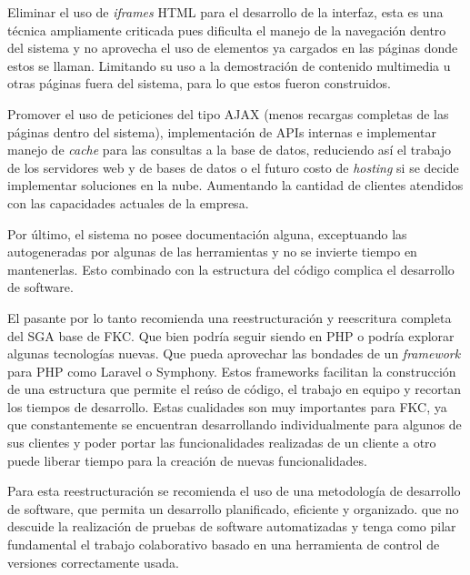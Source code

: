 Eliminar el uso de \emph{iframes} HTML para el desarrollo de la interfaz, esta es una técnica ampliamente criticada pues dificulta el manejo de la navegación dentro del sistema y no aprovecha el uso de elementos ya cargados en las páginas donde estos se llaman. Limitando su uso a la demostración de contenido multimedia u otras páginas fuera del sistema, para lo que estos fueron construidos.

Promover el uso de peticiones del tipo AJAX (menos recargas completas de las páginas dentro del sistema), implementación de APIs internas e implementar manejo de \emph{cache} para las consultas a la base de datos, reduciendo así el trabajo de los servidores web y de bases de datos o el futuro costo de \emph{hosting} si se decide implementar soluciones en la nube. Aumentando la cantidad de clientes atendidos con las capacidades actuales de la empresa.

Por último, el sistema no posee documentación alguna, exceptuando las autogeneradas por algunas de las herramientas y no se invierte tiempo en mantenerlas. Esto combinado con la estructura del código complica el desarrollo de software.

El pasante por lo tanto recomienda una reestructuración y reescritura completa del SGA base de FKC. Que bien podría seguir siendo en PHP o podría explorar algunas tecnologías nuevas. Que pueda aprovechar las bondades de un \emph{framework} para PHP como Laravel o Symphony. Estos frameworks facilitan la construcción de una estructura que permite el reúso de código, el trabajo en equipo y recortan los tiempos de desarrollo. Estas cualidades son muy importantes para FKC, ya que constantemente se encuentran desarrollando individualmente para algunos de sus clientes y poder portar las funcionalidades realizadas de un cliente a otro puede liberar tiempo para la creación de nuevas funcionalidades.

Para esta reestructuración se recomienda el uso de una metodología de desarrollo de software, que permita un desarrollo planificado, eficiente y organizado. que no descuide la realización de pruebas de software automatizadas y tenga como pilar fundamental el trabajo colaborativo basado en una herramienta de control de versiones correctamente usada.


